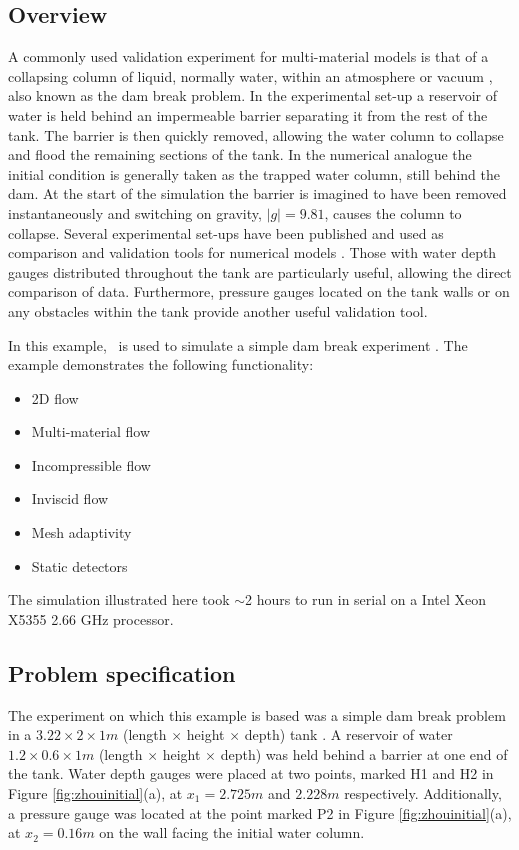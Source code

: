 \subsection{Overview}
A commonly used validation experiment for multi-material models is that of a collapsing column of liquid, normally water, within an atmosphere or vacuum \citep{lakehal_interface_2002}, also known as the dam break problem.  In the experimental set-up a reservoir of water is held behind an impermeable barrier separating it from the rest of the tank.  The barrier is then quickly removed, allowing the water column to collapse and flood the remaining sections of the tank.  In the numerical analogue the initial condition is generally taken as the trapped water column, still behind the dam.  At the start of the simulation the barrier is imagined to have been removed instantaneously and switching on gravity, $|g| = 9.81$, causes the column to collapse.   Several experimental set-ups have been published and used as comparison and validation tools for numerical models \citep{martin_part_1952, greaves_simulation_2006}.  Those with water depth gauges distributed throughout the tank are particularly useful, allowing the direct comparison of data.  Furthermore, pressure gauges located on the tank walls or on any obstacles within the tank provide another useful validation tool.

In this example, \fluidity\ is used to simulate a simple dam break experiment \citep{zhou_nonlinear_1999}.  The example demonstrates the following functionality:

\begin{itemize}
\item 2D flow
\item Multi-material flow
\item Incompressible flow
\item Inviscid flow
\item Mesh adaptivity
\item Static detectors
\end{itemize}

The simulation illustrated here took $\sim$2 hours to run in serial on a Intel Xeon X5355 2.66 GHz processor.

\subsection{Problem specification}
The experiment on which this example is based was a simple dam break problem in a $3.22\times2\times1m$ (length $\times$ height $\times$ depth) tank \citep{zhou_nonlinear_1999}.  A reservoir of water $1.2\times0.6\times1m$ (length $\times$ height $\times$ depth) was held behind a barrier at one end of the tank.  Water depth gauges were placed at two points, marked H1 and H2 in Figure \ref{fig:zhouinitial}(a), at $x_1 = 2.725m$ and $2.228m$ respectively.  Additionally, a pressure gauge was located at the point marked P2 in Figure \ref{fig:zhouinitial}(a), at $x_2=0.16m$ on the wall facing the initial water column.

